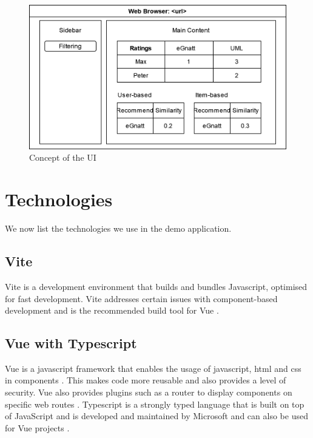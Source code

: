 \begin{figure}[h]
\centering
\includegraphics[width=\textwidth]{images/ui_concept.drawio.png}
\caption{\label{fig:ui_design_demo}Concept of the UI}
\end{figure}

\newpage

\section{Technologies}

\label{sec:demo_tec}

We now list the technologies we use in the demo application.

\subsection{Vite}

Vite is a development environment that builds and bundles Javascript, optimised for fast development. Vite addresses certain issues with component-based development and is the recommended build tool for Vue \cite{Vite}.

\subsection{Vue with Typescript}

Vue is a javascript framework that enables the usage of javascript, html and css in components \cite{Vue}. This makes code more reusable and also provides a level of security. Vue also provides plugins such as a router to display components on specific web routes \cite{VueRouter}. Typescript is a strongly typed language that is built on top of JavaScript and is developed and maintained by Microsoft and can also be used for Vue projects \cite{typescirpt}. 

